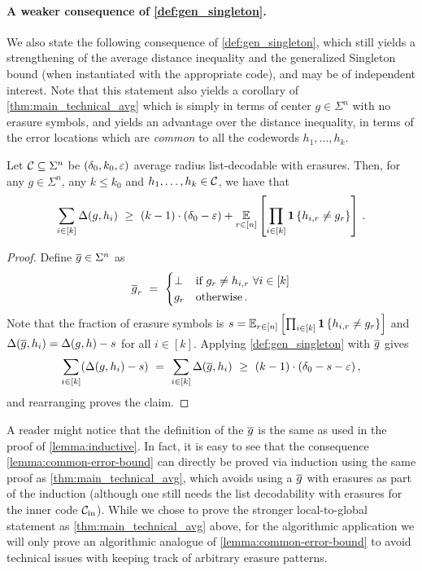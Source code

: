 \paragraph{A weaker consequence of \cref{def:gen_singleton}.}
%
We also state the following consequence of \cref{def:gen_singleton}, which still yields a
strengthening of the average distance inequality and the generalized Singleton bound (when
instantiated with the appropriate code), and may be of independent interest. 
%
Note that this statement also yields a corollary of \cref{thm:main_technical_avg} which is simply in
terms of center $g \in \Sigma^n$ with no erasure symbols, and yields an advantage over the distance
inequality, in terms of the error locations which are \emph{common} to all the codewords $h_1, \ldots, h_k$.
%
\begin{lemma}\label{lemma:common-error-bound}
%
Let ${\mathcal C} \subseteq \Sigma^n$ be $(\delta_0, k_0, \varepsilon)$ average radius list-decodable with
erasures. Then, for any $g \in \Sigma^n$, any $k \leq k_0$ and $h_1, \ldots, h_k \in {\mathcal C}$, we have
that
\[ \sum_{i \in [k]} \Delta(g,h_i) ~\geq~ (k-1) \cdot (\delta_0 - \eps) + \Ex{r \in [n]}{\prod_{i \in
    [k]}\indi{h_{i,r} \neq g_r}} \mper
\]
%
\end{lemma}
%
\begin{proof}
Define $\overline{g} \in \Sigma^n$ as 
\[
\overline{g}_r ~=~ 
\begin{cases}
\bot & \text{if} ~g_r \neq h_{i,r} ~\forall i \in [k] \\
g_r &\text{otherwise} \,.
\end{cases}
\]
Note that the fraction of erasure symbols is $s = \Ex{r \in [n]}{\prod_{i \in [k]}\indi{h_{i,r} \neq
    g_r}}$ and $\Delta(\overline{g},h_i) = \Delta(g,h) - s$ for all $i \in [k]$. Applying
\cref{def:gen_singleton} with $\overline{g}$ gives
\[
\sum_{i \in [k]} (\Delta(g,h_i) - s) 
~=~ \sum_{i \in [k]} \Delta(\overline{g},h_i) 
~\geq~ (k-1) \cdot (\delta_0 - s - \varepsilon) \,,
\]
and rearranging proves the claim.
\end{proof}
% 
%
\begin{remark}
A reader might notice that the definition of the $\overline{g}$ is the same as used in the proof of
\cref{lemma:inductive}. 
%
In fact, it is easy to see that the consequence \cref{lemma:common-error-bound} can directly be
proved via induction using the same proof as \cref{thm:main_technical_avg}, which avoids using a
$\overline{g}$ with erasures as part of the induction (although one still needs the list decodability
with erasures for the inner code ${\mathcal C}_{\mathrm{in}}$).
%
While we chose to prove the stronger local-to-global statement as \cref{thm:main_technical_avg}
above, for the algorithmic application we will only prove an algorithmic analogue of
\cref{lemma:common-error-bound} to avoid technical issues with keeping track of arbitrary erasure patterns.
%
\end{remark}
%





